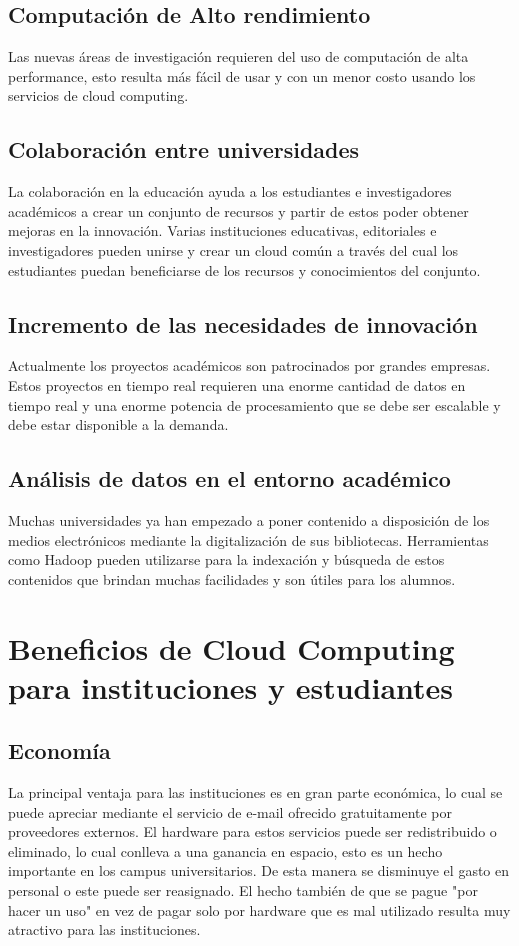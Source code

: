 \documentclass[journal]{IEEEtran}
\begin{document}
\subsection{Computación de Alto rendimiento}
Las nuevas áreas de investigación requieren del uso de computación de alta performance, esto resulta más fácil de usar y con un menor costo usando los servicios de cloud computing.
\subsection{Colaboración entre universidades}
La colaboración en la educación ayuda a los estudiantes e investigadores académicos a crear un conjunto de recursos y partir de estos poder obtener mejoras en la innovación. Varias instituciones educativas, editoriales e investigadores pueden unirse y crear un cloud común a través del cual los estudiantes puedan beneficiarse de los recursos y conocimientos del conjunto.
\subsection{Incremento de las necesidades de innovación}
Actualmente los proyectos académicos son patrocinados por grandes empresas. Estos proyectos en tiempo real requieren una enorme cantidad de datos en tiempo real y una enorme potencia de procesamiento que se debe ser escalable y debe estar disponible a la demanda.
\subsection{Análisis de datos en el entorno académico}
Muchas universidades ya han empezado a poner contenido a disposición de los medios electrónicos mediante la digitalización de sus bibliotecas. Herramientas como Hadoop pueden utilizarse para la indexación y búsqueda de estos contenidos que brindan muchas facilidades y son útiles para los alumnos.

\section{Beneficios de Cloud Computing para instituciones y estudiantes}
\subsection{Economía}
La principal ventaja para las instituciones es en gran parte económica, lo cual se puede apreciar mediante el servicio de e-mail ofrecido gratuitamente por proveedores externos. El hardware para estos servicios puede ser redistribuido o eliminado, lo cual conlleva a una ganancia en espacio, esto es un hecho importante en los campus universitarios. De esta manera se disminuye el gasto en personal o este puede ser reasignado. El hecho también de que se pague "por hacer un uso" en vez de pagar solo por hardware que es mal utilizado resulta muy atractivo para las instituciones.
\end{document}
